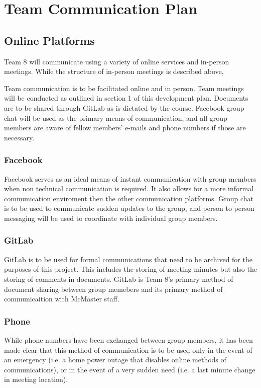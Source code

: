 \documentclass{article}
\begin{document}
\section{Team Communication Plan}
\subsection{Online Platforms}
Team 8 will communicate using a variety of online services and in-person 
meetings. While the structure of in-person meetings is described above, 


Team communication is to be facilitated online and in person. Team meetings will 
be conducted as outlined in section 1 of this development plan. Documents are to 
be shared through GitLab as is dictated by the course. Facebook group chat will 
be used as the primary means of communication, and all group members are aware 
of fellow members’ e-mails and phone numbers if those are necessary.

\subsubsection{Facebook}
Facebook serves as an ideal means of instant communication with group members when non technical communication is required. It also allows for a more informal communication enviroment then the other communication platforms. Group chat is to be used to communicate sudden updates to the group, and person to person messaging will be used to coordinate with individual group members.

\subsubsection{GitLab}
GitLab is to be used for formal communications that need to be archived for the purposes of this project. This includes the storing of meeting minutes but also the storing of comments in documents. GitLab is Team 8's primary method of document sharing between group memebers and its primary method of communicaition with McMaster staff.

\subsubsection{Phone}
While phone numbers have been exchanged between group members, it has been made clear that this method of communication is to be used only in the event of an emergency (i.e. a home power outage that disables online methods of communications), or in the event of a very sudden need (i.e. a last minute change in meeting location).
\end{document}
